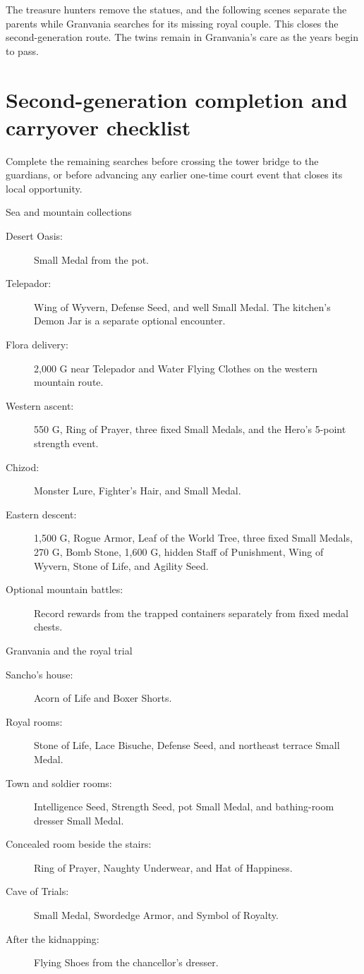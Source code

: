 The treasure hunters remove the statues, and the following scenes
separate the parents while Granvania searches for its missing
royal couple. This closes the second-generation route. The twins
remain in Granvania's care as the years begin to pass.

\section{Second-generation completion and carryover checklist}

Complete the remaining searches before crossing the tower bridge
to the guardians, or before advancing any earlier one-time court
event that closes its local opportunity.

\begin{routecheck}{Sea and mountain collections}
\begin{description}
  \item[Desert Oasis:] Small Medal from the pot.
  \item[Telepador:] Wing of Wyvern, Defense Seed, and well Small Medal.
    The kitchen's Demon Jar is a separate optional encounter.
  \item[Flora delivery:] 2,000 G near Telepador and Water Flying
    Clothes on the western mountain route.
  \item[Western ascent:] 550 G, Ring of Prayer, three fixed Small
    Medals, and the Hero's 5-point strength event.
  \item[Chizod:] Monster Lure, Fighter's Hair, and Small Medal.
  \item[Eastern descent:] 1,500 G, Rogue Armor, Leaf of the World Tree,
    three fixed Small Medals, 270 G, Bomb Stone, 1,600 G,
    hidden Staff of Punishment, Wing of Wyvern, Stone of Life,
    and Agility Seed.
  \item[Optional mountain battles:] Record rewards from the trapped
    containers separately from fixed medal chests.
\end{description}
\end{routecheck}

\begin{routecheck}{Granvania and the royal trial}
\begin{description}
  \item[Sancho's house:] Acorn of Life and Boxer Shorts.
  \item[Royal rooms:] Stone of Life, Lace Bisuche, Defense Seed,
    and northeast terrace Small Medal.
  \item[Town and soldier rooms:] Intelligence Seed, Strength Seed,
    pot Small Medal, and bathing-room dresser Small Medal.
  \item[Concealed room beside the stairs:] Ring of Prayer,
    Naughty Underwear, and Hat of Happiness.
  \item[Cave of Trials:] Small Medal, Swordedge Armor, and
    Symbol of Royalty.
  \item[After the kidnapping:] Flying Shoes from the chancellor's
    dresser.
\end{description}
\end{routecheck}

